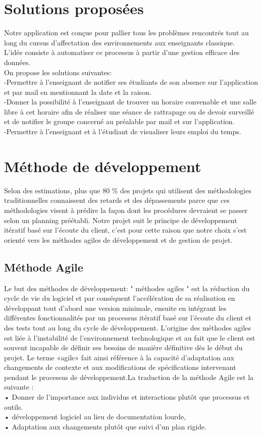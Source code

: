\documentclass[a4paper,12pt,oneside]{report}
\begin{document}
\section{Solutions proposées}
  Notre application est conçue pour pallier tous les problèmes rencontrés tout au long du cursus d'affectation des environnements aux enseignants classique. \\
   L'idée consiste à automatiser ce processus à partir d'une gestion efficace des données.\\ On propose les solutions suivantes: \\
   -Permettre à l'enseignant de notifier ses étudiants de son absence sur l'application et par mail en mentionnant la date et la raison.
   \\
   -Donner la possibilité à l'enseignant de trouver un horaire convenable et une salle libre à cet horaire afin de réaliser une séance de rattrapage ou  de devoir surveillé et de notifier le groupe concerné au préalable par mail et sur l'application.
   \\
   -Permettre à l'enseignant et à l'étudiant de visualiser leurs emploi du temps.
  \section{ Méthode de développement}
  Selon des estimations, plus que 80 \% des projets qui utilisent des méthodologies traditionnelles connaissent des retards et des dépassements parce que ces méthodologies visent à prédire la façon dont les procédures devraient se passer selon un planning préétabli. Notre projet suit le principe de développement itératif basé sur l'écoute du client, c'est pour cette raison que notre choix s'est orienté vers les méthodes agiles de développement et de gestion de projet.
  \subsection{Méthode Agile}
  Le but des méthodes de développement: " méthodes agiles "  est la réduction du cycle de vie du logiciel et par conséquent l'accélération de sa réalisation en
développant tout d'abord une version minimale, ensuite en intégrant les différentes fonctionnalités par un processus itératif basé sur l'écoute du client et des tests tout au long du cycle de développement. 
L'origine des méthodes agiles est liée à l'instabilité de l'environnement technologique et au fait que le client est souvent incapable de définir ses besoins de manière définitive dès le début du projet. 
Le terme «agile» fait ainsi référence à la capacité d'adaptation aux changements de contexte et aux modifications de spécifications intervenant pendant le processus de développement.La traduction de la méthode Agile est la suivante :\\
• Donner de l'importance aux individus et interactions plutôt que processus et outils.\\
• développement logiciel au lieu de documentation lourde, \\
• Adaptation aux changements plutôt que suivi d'un plan rigide. \\
\end{document}
